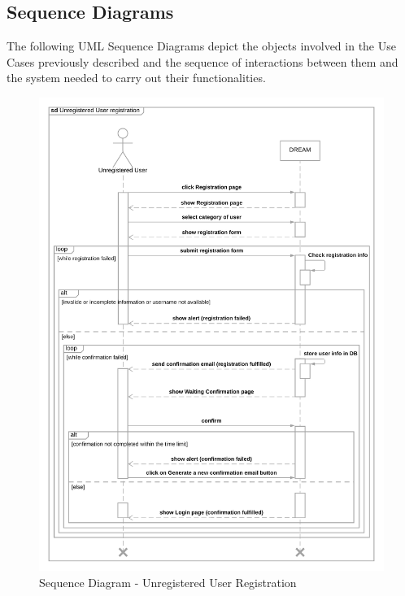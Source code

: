 \subsection{Sequence Diagrams}

The following UML Sequence Diagrams depict the objects involved in the Use Cases previously described and the sequence of interactions between them and the system needed to carry out their functionalities.\\

\begin{center}
    \begin{figure}[H]
  \includegraphics[width=\textwidth,height=\textheight,keepaspectratio]{./Images/Sequence Diagram User Registration.png}
  \caption{Sequence Diagram - Unregistered User Registration}
\end{figure}
\end{center}

